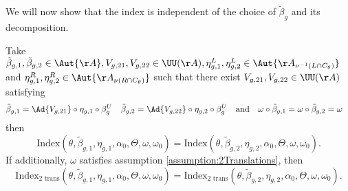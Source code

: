 We will now show that the index is independent of the choice of $\tilde{\beta}_g$ and its decomposition.
\begin{lemma}\label{lem:InvarianceUnderChoiceBeta}
	Take $\tilde{\beta}_{g,1},\tilde{\beta}_{g,2}\in\Aut{\AA},V_{g,21},V_{g,22}\in\UU(\AA),\eta_{g,1}^L,\eta_{g,2}^L\in \Aut{\AA_{\nu^{-1}(L\cap C_\theta)}}$ and $\eta_{g,1}^R,\eta_{g,2}^R\in \Aut{\AA_{\nu(R\cap C_\theta)}}$ such that there exist $V_{g,21},V_{g,22}\in\UU(\AA)$ satisfying
	\begin{align}\label{eq:InvarianceUnderChoiceBetaTwoBetas}
		\tilde{\beta}_{g,1}&=\Ad{V_{g,21}}\circ\eta_{g,1}\circ\beta^U_g&\tilde{\beta}_{g,2}&=\Ad{V_{g,22}}\circ\eta_{g,2}\circ\beta^U_g&&\text{and}&\omega\circ\tilde{\beta}_{g,1}&=\omega\circ\tilde{\beta}_{g,2}=\omega
	\end{align}then
	\begin{equation}
		\textrm{Index}(\theta,\tilde{\beta}_{g,1},\eta_{g,1},\alpha_{0},\Theta,\omega,\omega_0)=\textrm{Index}(\theta,\tilde{\beta}_{g,2},\eta_{g,2},\alpha_{0},\Theta,\omega,\omega_0).
	\end{equation}
	If additionally, $\omega$ satisfies assumption \ref{assumption:2Translations},	then
	\begin{equation}
		\textrm{Index}_{\text{2 trans}}(\theta,\tilde{\beta}_{g,1},\eta_{g,1},\alpha_{0},\Theta,\omega,\omega_0)=\textrm{Index}_{\text{2 trans}}(\theta,\tilde{\beta}_{g,2},\eta_{g,2},\alpha_{0},\Theta,\omega,\omega_0).
	\end{equation}
\end{lemma}
